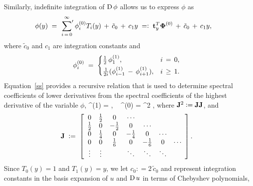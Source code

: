 \documentclass[%
secnumarabic,%
 amssymb, amsmath,%
 aps,prf,superscriptaddress,longbibliography
frontmatterverbose,
]{revtex4-2}
\newcommand{\DefinedAs}[0]{\mathrel{\mathop:}=}
\newcommand{\AsDefined}[0]{=\mathrel{\mathop:}}
\begin{document}
Similarly, indefinite integration of $\mathrm D \, \phi$ allows us to express $\phi$ as
	\begin{align*}
  	\phi (y) 
	\;&=\; 
	\sideset{}{'}\sum_{i \, = \, 0}^{\infty} 
	\phi_i^{(0)} T_i(y) \,+ \, \tilde{c}_0 \, + \,c_1 y
	 \; \AsDefined \;
	  \HH t_y^T \BB \Phi^{(0)} 
	  \,+\, 
	 \tilde{c}_0 \, + \,c_1 y,
\end{align*}
where $\tilde{c}_0$ and $c_1$ are integration constants and 
\begin{equation}
  \phi_i^{(0)} \;=\;
  \begin{cases}
    \tfrac{1}{2} \, \phi_1^{(1)}, & i \, = \, 0,
    \\[0.1cm]
  \tfrac{1}{2i} (\phi_{i-1}^{(1)}\,-\,\phi_{i+1}^{(1)}), &  i \, \geq \, 1.
  \end{cases}
  \nonumber
  \end{equation}
Equation~\eqref{ss} provides a recursive relation that is used to determine spectral coefficients of lower derivatives from the spectral coefficients of the highest derivative of the variable $\phi$,
	\be
	\BB \Phi^{(1)}
	\; = \;
	\J \BB \Phi,
	~
	\BB \Phi^{(0)}
	\; = \;
	\J^2 \BB \Phi,
	\non
	\ee
where $\J^2 \DefinedAs \J \J$, and
\begin{equation}\label{eq:J}
  \J \;\DefinedAs\; \left[\begin{array}{ccccccc}
     0& \tfrac{1}{2} & 0 & \cdots\\
    \tfrac{1}{2} & 0 & -\tfrac{1}{2} & 0 &\cdots \\
    0 & \tfrac{1}{4} & 0 & -\tfrac{1}{4} & 0 &\cdots \\
    0 & 0 & \tfrac{1}{6} & 0 & -\tfrac{1}{6} & 0 &\cdots \\
    \vdots & \vdots &  & \ddots & \ddots & \ddots & \\
  \end{array}\right].
\end{equation}
Since $T_0(y) = 1$ and $T_1(y) = y$, we let $c_0 \DefinedAs 2 \,\tilde{c}_0$ and represent integration constants in the basis expansion of $u$ and $\mathrm D \, u$ in terms of Chebyshev polynomials,
\end{document}
